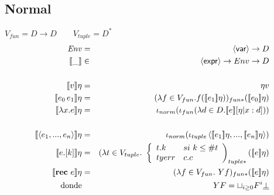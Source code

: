     \subsection{Normal}
      \PN $V_{fun} = D \rightarrow D \qquad V_{tuple} = D^{*}$
      \begin{eqnarray*}
        \Env &=& \var \to  D \\
        \llbracket\_\rrbracket &\in& \expr \to  Env \to  D \\ \\
        \llbracket v \rrbracket\eta &=& \eta v \\
        \llbracket e_0\, e_1\rrbracket\eta &=& (\lambda f \in V_{fun}. f(\se{e_1}\eta))_{fun*} (\se{e_0}\eta) \\
        \llbracket\lambda x.e\rrbracket\eta &=& \iota_{norm}(\iota_{fun}(\lambda d \in D. \se{e}[\eta|x:d])) \\ \\
        \se{\la e_1, ..., e_n \ra}\eta &=& \iota_{norm}(\iota_{tuple} \la \se{e_1}\eta, ..., \se{e_n}\eta \ra) \\
        \se{e.[k]}\eta &=& (\lambda t \in V_{tuple}. \ \left\lbrace 
        \begin{array}{lll}
          t.k & si \ k \leq \# t \\
          tyerr & c.c \\
        \end{array}\right)_{tuple*} (\se{e}\eta) \\
        \se{\textbf{rec}\  e} \eta &=& (\lambda f \in  V_{fun}.\ Y f)_{fun*} (\se{e}\eta ) \\
        \text{donde} && Y F = \sqcup_{i \geq 0} F^{i} \underline{\bot}
      \end{eqnarray*}
        
